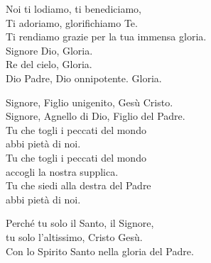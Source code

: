 

\spazio

Noi ti lodiamo, ti benediciamo,\\
Ti adoriamo, glorifichiamo Te.\\
Ti rendiamo grazie per la tua immensa gloria.\\
Signore Dio, Gloria.\\
Re del cielo, Gloria.\\
Dio Padre, Dio onnipotente. Gloria.

\spazio


\spazio

Signore, Figlio unigenito, Gesù Cristo.\\
Signore, Agnello di Dio, Figlio del Padre.\\
Tu che togli i peccati del mondo\\
abbi pietà di noi.\\
Tu che togli i peccati del mondo\\
accogli la nostra supplica.\\
Tu che siedi alla destra del Padre\\
abbi pietà di noi.

\spazio


\spazio

Perché tu solo il Santo, il Signore,\\
tu solo l’altissimo, Cristo Gesù.\\
Con lo Spirito Santo nella gloria del Padre.

\spazio

